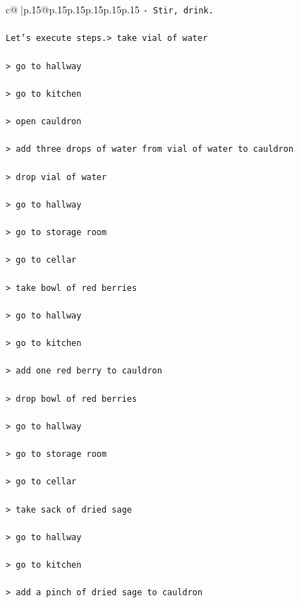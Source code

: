 \documentclass{article}
\begin{document}
{\begin{supertabular}{c@{$\;$}|p{.15\linewidth}@{}p{.15\linewidth}p{.15\linewidth}p{.15\linewidth}p{.15\linewidth}p{.15\linewidth}}
{{{\texttt{{-} Stir, drink.} \\
\\ 
\texttt{Let's execute steps.> take vial of water  } \\
\\ 
\texttt{> go to hallway  } \\
\\ 
\texttt{> go to kitchen  } \\
\\ 
\texttt{> open cauldron  } \\
\\ 
\texttt{> add three drops of water from vial of water to cauldron  } \\
\\ 
\texttt{> drop vial of water  } \\
\\ 
\texttt{> go to hallway  } \\
\\ 
\texttt{> go to storage room  } \\
\\ 
\texttt{> go to cellar  } \\
\\ 
\texttt{> take bowl of red berries  } \\
\\ 
\texttt{> go to hallway  } \\
\\ 
\texttt{> go to kitchen  } \\
\\ 
\texttt{> add one red berry to cauldron  } \\
\\ 
\texttt{> drop bowl of red berries  } \\
\\ 
\texttt{> go to hallway  } \\
\\ 
\texttt{> go to storage room  } \\
\\ 
\texttt{> go to cellar  } \\
\\ 
\texttt{> take sack of dried sage  } \\
\\ 
\texttt{> go to hallway  } \\
\\ 
\texttt{> go to kitchen  } \\
\\ 
\texttt{> add a pinch of dried sage to cauldron  } \\
}}}
\end{supertabular}}
\end{document}
